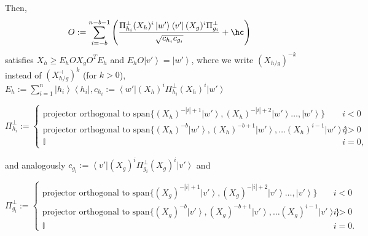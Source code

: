 \documentclass{article}
\begin{document}
\begin{proposition}
\begin{itemize}
  \end{itemize}
  Then,
  \begin{displaymath}
    O:=\sum_{i=-b}^{n-b-1}\left(\frac{\Pi_{h_{i}}^{\perp}(X_{h})^{i}\left|w'\right\rangle \left\langle v'\right|(X_{g})^{i}\Pi_{g_{i}}^{\perp}}{\sqrt{c_{h_{i}}c_{g_{i}}}}+\hc\right)
  \end{displaymath}
  satisfies
  $X_{h}\ge E_{h}OX_{g}O^{T}E_{h}$ and $E_{h}O\left|v'\right\rangle =\left|w'\right\rangle$,
  where we write $(X_{h/g})^{-k}$ instead of $(X_{h/g}^{\dashv})^{k}$
  (for $k>0$),
  $
    E_{h}:=\sum_{i=1}^{n}\left|h_{i}\right\rangle \left\langle h_{i}\right|, c_{h_{i}}:=\left\langle w'\right|(X_{h})^{i}\Pi_{h_{i}}^{\perp}(X_{h})^{i}\left|w'\right\rangle
  $
  \begin{small}
    \begin{displaymath}
      \Pi_{h_{i}}^{\perp}:=\begin{cases}
        \text{projector orthogonal to }\text{span}\{(X_{h})^{-|i|+1}\left|w'\right\rangle ,(X_{h})^{-|i|+2}\left|w'\right\rangle \dots,\left|w'\right\rangle \}        & i<0  \\
        \text{projector orthogonal to }\text{span}\{(X_{h})^{-b}\left|w'\right\rangle ,(X_{h})^{-b+1}\left|w'\right\rangle ,\dots(X_{h})^{i-1}\left|w'\right\rangle \} & i>0  \\
        \mathbb{I}                                                                                                                                                     & i=0,
      \end{cases}
    \end{displaymath}
  \end{small}
  and analogously $c_{g_{i}}:=\left\langle v'\right|(X_{g})^{i}\Pi_{g_{i}}^{\perp}(X_{g})^{i}\left|v'\right\rangle $ and
  \begin{small}
    \begin{displaymath}
      \Pi_{g_{i}}^{\perp}:=\begin{cases}
        \text{projector orthogonal to }\text{span}\{(X_{g})^{-|i|+1}\left|v'\right\rangle ,(X_{g})^{-|i|+2}\left|v'\right\rangle \dots,\left|v'\right\rangle \}        & i<0  \\
        \text{projector orthogonal to }\text{span}\{(X_{g})^{-b}\left|v'\right\rangle ,(X_{g})^{-b+1}\left|v'\right\rangle ,\dots(X_{g})^{i-1}\left|v'\right\rangle \} & i>0  \\
        \mathbb{I}                                                                                                                                                     & i=0.
      \end{cases}
    \end{displaymath}
  \end{small}


\end{proposition}
\end{document}
